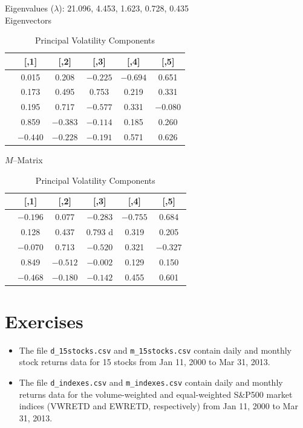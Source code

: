 	\begin{table}[H]
	\centering
	\caption{Principal Volatility Components \label{tab:pvctable}}
	Eigenvalues ($\lambda$): 21.096, 4.453, 1.623, 0.728, 0.435 \\
	
	Eigenvectors
	
	\begin{tabular}{| l | c | c | c | c | c |} \hline
        &    [,1]   &    [,2]    &   [,3]    &   [,4]   &     [,5] \\ \hline
	[1,] & 0.015 & 0.208 & $-0.225$ & $-0.694$ &  0.651 \\ \hline
	[2,] & 0.173 & 0.495 & 0.753 & 0.219 & 0.331 \\ \hline
	[3,] & 0.195 & 0.717 & $-0.577$ & 0.331 & $-0.080$ \\ \hline
	[4,] & 0.859 & $-0.383$ & $-0.114$ & 0.185 & 0.260 \\ \hline
	[5,] & $-0.440$ & $-0.228$ & $-0.191$ & 0.571 & 0.626 \\
	\end{tabular}
	
	$M$--Matrix \\[0.1cm]
	
	\begin{tabular}{| l | c | c | c | c | c |} \hline
	         &   [,1]   &     [,2]    &     [,3]   &    [,4]   &    [,5] \\ \hline
	[1,] & $-0.196$ & 0.077 & $-0.283$ & $-0.755$ & 0.684 \\ \hline
	[2,] & 0.128 & 0.437 & 0.793 d & 0.319 & 0.205 \\ \hline
	[3,]& $-0.070$ & 0.713 & $-0.520$ & 0.321 & $-0.327$ \\ \hline
	[4,] & 0.849 & $-0.512$ & $-0.002$ & 0.129 & 0.150 \\ \hline
	[5,] & $-0.468$ & $-0.180$ & $-0.142$ & 0.455 & 0.601 \\
	\end{tabular}
	\end{table}



\section{Exercises}


\prob
\begin{itemize}
\item The file {\tt d\_15stocks.csv} and {\tt m\_15stocks.csv} contain daily and monthly stock returns data for 15 stocks from Jan 11, 2000 to Mar 31, 2013.
\item The file {\tt d\_indexes.csv} and {\tt m\_indexes.csv} contain daily and monthly returns data for the volume-weighted and equal-weighted S\&P500 market indices (VWRETD and EWRETD, respectively) from Jan 11, 2000 to Mar 31, 2013.
\end{itemize}

